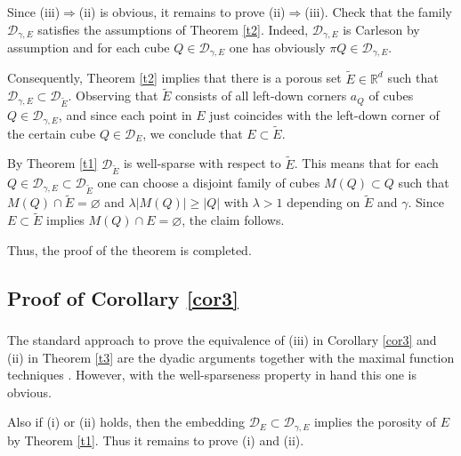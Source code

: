 \documentclass[12pt]{amsart} \setlength{\textwidth}{15cm} \setlength{\textheight}{24cm} \setlength{\voffset}{-1cm} \setlength{\oddsidemargin}{-0.4cm} \setlength{\evensidemargin}{-0.4cm}
\theoremstyle{definition}
\theoremstyle{remark}
\newcommand{\rd}{\mathbb{R}^d}
\begin{document}
 \subsubsection{} Since (iii)$\Rightarrow$(ii) is obvious, it remains to  prove
   (ii)$\Rightarrow$(iii).
Check that the family $\mathcal{D}_{\gamma, E}$ satisfies the assumptions of Theorem \ref{t2}.
Indeed,  $\mathcal{D}_{\gamma, E}$ is Carleson by assumption and   for each cube $Q \in \mathcal{D}_{\gamma, E}$
one has obviously $\pi Q \in \mathcal{D}_{\gamma, E}$.

Consequently, Theorem \ref{t2} implies that
there is a porous set $\widetilde{E}\in  \rd$ such that
$\mathcal{D}_{\gamma, E}  \subset \mathcal{D}_{\widetilde{E}}$.
 Observing that $\widetilde{E}$ consists of all left-down corners $a_Q$ of cubes $Q \in
\mathcal{D}_{\gamma, E}$, and since each point in $E$ just coincides with the left-down corner of the certain   cube $Q \in \mathcal{D}_E$, we conclude that $E \subset \widetilde{E}$.



By Theorem \ref{t1} $\mathcal{D}_{\widetilde{E}}$ is well-sparse with respect to $\widetilde{E}$. This means that for each  $Q \in \mathcal{D}_{\gamma, E} \subset \mathcal{D}_{\widetilde{E}}$ one can choose a  disjoint family of cubes $M(Q) \subset Q$ such that  $M(Q) \cap \widetilde{E} = \varnothing$
and $\lambda| M(Q)| \geq |Q|$ with $\lambda>1$ depending on $\widetilde{E}$ and $\gamma$.
Since $E \subset \widetilde{E} $ implies $M(Q) \cap E =\varnothing $, the claim
  follows.

Thus,  the proof of the theorem is completed.

\subsection{Proof of Corollary \ref{cor3}}
\subsubsection{}

  The  standard approach  to prove the equivalence of (iii) in Corollary \ref{cor3} and (ii) in Theorem \ref{t3} are  the dyadic   arguments  \cite[p. 59, Lemma 5]{MC} together  with   the maximal function techniques  \cite[Theorem 2.10]{IV}. However, with  the well-sparseness property in hand this one is obvious.

 Also if (i) or (ii) holds, then  the embedding $\mathcal{D}_{ E}  \subset \mathcal{D}_{\gamma, E} $ implies the  porosity of $E$ by Theorem \ref{t1}. Thus it remains to prove (i) and (ii).
\end{document}

